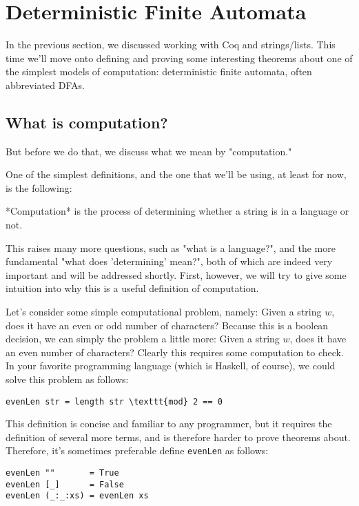 \section{Deterministic Finite Automata}

In the previous section, we discussed working with Coq and strings/lists.
This time we'll move onto defining and proving some interesting theorems about one of the simplest models of computation: deterministic finite automata, often abbreviated DFAs.

\subsection{What is computation?}

But before we do that, we discuss what we mean by "computation."

One of the simplest definitions, and the one that we'll be using, at least for now, is the following:

*Computation* is the process of determining whether a string is in a language or not.

This raises many more questions, such as "what is a language?", and the more fundamental "what does 'determining' mean?", both of which are indeed very important and will be addressed shortly.
First, however, we will try to give some intuition into why this is a useful definition of computation.

Let's consider some simple computational problem, namely: Given a string $w$, does it have an even or odd number of characters?
Because this is a boolean decision, we can simply the problem a little more: Given a string $w$, does it have an even number of characters?
Clearly this requires some computation to check.
In your favorite programming language (which is Haskell, of course), we could solve this problem as follows:

\begin{verbatim}
evenLen str = length str \texttt{mod} 2 == 0
\end{verbatim}

This definition is concise and familiar to any programmer, but it requires the definition of several more terms, and is therefore harder to prove theorems about.
Therefore, it's sometimes preferable define \texttt{evenLen} as follows:

\begin{verbatim}
evenLen ""       = True
evenLen [_]      = False
evenLen (_:_:xs) = evenLen xs
\end{verbatim}


